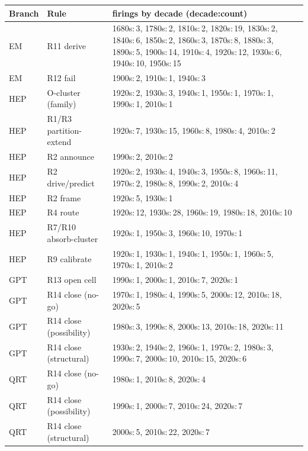 \begin{longtable}{@{}llp{10cm}@{}}\toprule
Branch & Rule & firings by decade (decade:count) \\\midrule\endhead
EM & R11 derive & 1680s:\,3, 1780s:\,2, 1810s:\,2, 1820s:\,19, 1830s:\,2, 1840s:\,6, 1850s:\,2, 1860s:\,3, 1870s:\,8, 1880s:\,3, 1890s:\,5, 1900s:\,14, 1910s:\,4, 1920s:\,12, 1930s:\,6, 1940s:\,10, 1950s:\,15 \\
EM & R12 fail & 1900s:\,2, 1910s:\,1, 1940s:\,3 \\
HEP & O-cluster (family) & 1920s:\,2, 1930s:\,3, 1940s:\,1, 1950s:\,1, 1970s:\,1, 1990s:\,1, 2010s:\,1 \\
HEP & R1/R3 partition-extend & 1920s:\,7, 1930s:\,15, 1960s:\,8, 1980s:\,4, 2010s:\,2 \\
HEP & R2 announce & 1990s:\,2, 2010s:\,2 \\
HEP & R2 drive/predict & 1920s:\,2, 1930s:\,4, 1940s:\,3, 1950s:\,8, 1960s:\,11, 1970s:\,2, 1980s:\,8, 1990s:\,2, 2010s:\,4 \\
HEP & R2 frame & 1920s:\,5, 1930s:\,1 \\
HEP & R4 route & 1920s:\,12, 1930s:\,28, 1960s:\,19, 1980s:\,18, 2010s:\,10 \\
HEP & R7/R10 absorb-cluster & 1920s:\,1, 1950s:\,3, 1960s:\,10, 1970s:\,1 \\
HEP & R9 calibrate & 1920s:\,1, 1930s:\,1, 1940s:\,1, 1950s:\,1, 1960s:\,5, 1970s:\,1, 2010s:\,2 \\
GPT & R13 open cell & 1990s:\,1, 2000s:\,1, 2010s:\,7, 2020s:\,1 \\
GPT & R14 close (no-go) & 1970s:\,1, 1980s:\,4, 1990s:\,5, 2000s:\,12, 2010s:\,18, 2020s:\,5 \\
GPT & R14 close (possibility) & 1980s:\,3, 1990s:\,8, 2000s:\,13, 2010s:\,18, 2020s:\,11 \\
GPT & R14 close (structural) & 1930s:\,2, 1940s:\,2, 1960s:\,1, 1970s:\,2, 1980s:\,3, 1990s:\,7, 2000s:\,10, 2010s:\,15, 2020s:\,6 \\
QRT & R14 close (no-go) & 1980s:\,1, 2010s:\,8, 2020s:\,4 \\
QRT & R14 close (possibility) & 1990s:\,1, 2000s:\,7, 2010s:\,24, 2020s:\,7 \\
QRT & R14 close (structural) & 2000s:\,5, 2010s:\,22, 2020s:\,7 \\
\bottomrule\end{longtable}
